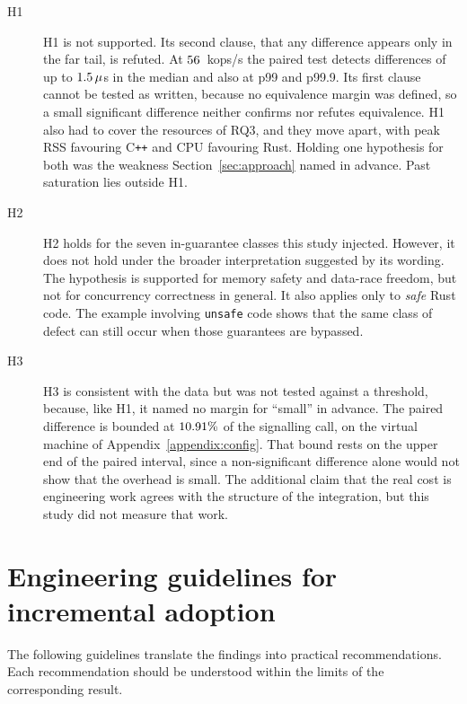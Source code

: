 \documentclass[english,oneside,a4paper,censored,csm,software-track-2020]{HYthesisML}
\begin{document}
\begin{description}
  \item[H1] H1 is not supported. Its second clause, that any difference
        appears only in the far tail, is refuted. At $56$~kops/s the
        paired test detects differences of up to $1.5\,\mu$s in
        the median and also at p99 and p99.9. Its first clause cannot be tested
        as written, because no equivalence margin was defined, so a small
        significant difference neither confirms nor refutes equivalence. H1
        also had to cover the resources of RQ3, and they move apart, with peak
        RSS favouring C\texttt{++} and CPU favouring Rust. Holding one hypothesis for
        both was the weakness Section~\ref{sec:approach} named in advance.
        Past saturation lies outside H1.
  \item[H2] H2 holds for the seven in-guarantee classes this study injected.
        However, it does not hold under the broader interpretation suggested by
        its wording. The hypothesis is supported for memory safety and
        data-race freedom, but not for concurrency correctness in general. It
        also applies only to \emph{safe} Rust code. The example involving
        \texttt{unsafe} code shows that the same class of defect can still
        occur when those guarantees are bypassed.
  \item[H3] H3 is consistent with the data but was not tested against a
        threshold, because, like H1, it named no margin for ``small'' in
        advance. The paired difference is bounded at $10.91\%$ of the
        signalling call, on the virtual machine of Appendix~\ref{appendix:config}.
        That bound rests on the upper end of the paired interval, since a
        non-significant difference alone would not show that the overhead is
        small. The additional claim that the real cost is engineering work agrees
        with the structure of the integration, but this study did not measure that
        work.
\end{description}

\section{Engineering guidelines for incremental adoption}\label{sec:guidelines}
The following guidelines translate the findings into practical
recommendations. Each recommendation should be understood within the limits of
the corresponding result.
\end{document}
